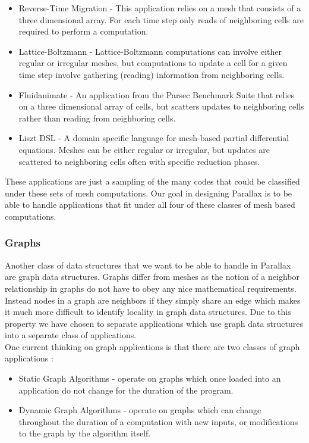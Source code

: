 \documentclass{article}
\theoremstyle{definition}
\begin{document}
\begin{itemize}
\item Reverse-Time Migration - This application relies on a mesh that consists of
a three dimensional array.  For each time step only reads of neighboring cells are
required to perform a computation.
\item Lattice-Boltzmann - Lattice-Boltzmann computations can involve either
regular or irregular meshes, but computations to update a cell for a given time
step involve gathering (reading) information from neighboring cells.
\item Fluidanimate - An application from the Parsec Benchmark Suite \cite{Bienia08}
that relies on a three dimensional array of cells, but scatters updates to
neighboring cells rather than reading from neighboring cells.
\item Liszt DSL - A domain specific language for mesh-based partial differential
equations.  Meshes can be either regular or irregular, but updates are scattered
to neighboring cells often with specific reduction phases.
\end{itemize}

\noindent
These applications are just a sampling of the many codes that could be 
classified under these sets of mesh computations.  Our goal in designing
Parallax is to be able to handle applications that fit under all four of
these classes of mesh based computations.

\subsubsection{Graphs \label{Graphs}}
\noindent
Another class of data structures that we want to be able to handle in Parallax
are graph data structures.  Graphs differ from meshes as the
notion of a neighbor relationship in graphs do not have to obey any nice 
mathematical requirements.  Instead nodes in a graph are neighbors
if they simply share an edge which makes it much more difficult to identify
locality in graph data structures.  Due to this property we have chosen
to separate applications which use graph data structures into a
separate class of applications. \\

\noindent
One current thinking on graph applications is that there are two classes of
graph applications \cite{Bader11}:

\begin{itemize}
\item Static Graph Algorithms - operate on graphs which once
loaded into an application do not change for the duration of the program.
\item Dynamic Graph Algorithms - operate on graphs which can change 
throughout the duration of a computation with new inputs, or modifications
to the graph by the algorithm itself.
\end{itemize} 
\end{document}
